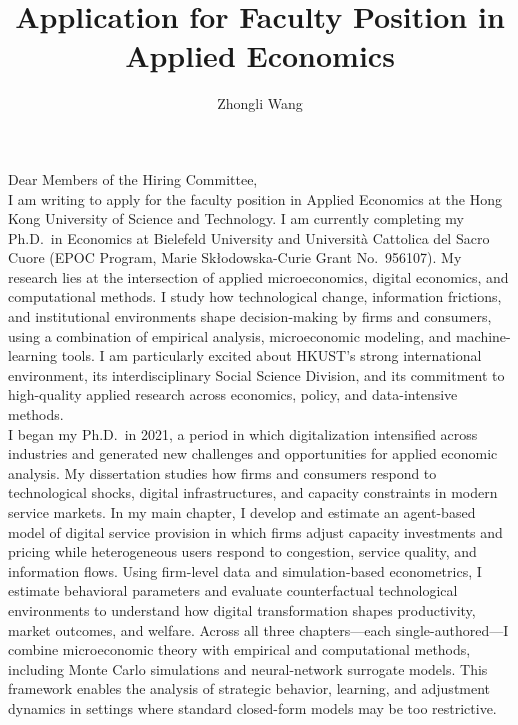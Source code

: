 \documentclass{nfr}
\title{Application for Faculty Position in Applied Economics}
\author{Zhongli Wang}
\begin{document}

% 
% 
% 
% 


\maketitle

\noindent Dear Members of the Hiring Committee,\\[0.2cm]

I am writing to apply for the faculty position in Applied Economics at the Hong Kong University of Science and Technology. 
I am currently completing my Ph.D.\ in Economics at Bielefeld University and Università Cattolica del Sacro Cuore (EPOC Program, Marie Skłodowska-Curie Grant No.~956107). 
My research lies at the intersection of applied microeconomics, digital economics, and computational methods. 
I study how technological change, information frictions, and institutional environments shape decision-making by firms and consumers, using a combination of empirical analysis, microeconomic modeling, and machine-learning tools. 
I am particularly excited about HKUST’s strong international environment, its interdisciplinary Social Science Division, and its commitment to high-quality applied research across economics, policy, and data-intensive methods.\\

I began my Ph.D.\ in 2021, a period in which digitalization intensified across industries and generated new challenges and opportunities for applied economic analysis. 
My dissertation studies how firms and consumers respond to technological shocks, digital infrastructures, and capacity constraints in modern service markets. 
In my main chapter, I develop and estimate an agent-based model of digital service provision in which firms adjust capacity investments and pricing while heterogeneous users respond to congestion, service quality, and information flows. 
Using firm-level data and simulation-based econometrics, I estimate behavioral parameters and evaluate counterfactual technological environments to understand how digital transformation shapes productivity, market outcomes, and welfare. 
Across all three chapters—each single-authored—I combine microeconomic theory with empirical and computational methods, including Monte Carlo simulations and neural-network surrogate models. 
This framework enables the analysis of strategic behavior, learning, and adjustment dynamics in settings where standard closed-form models may be too restrictive.\\
\end{document}
